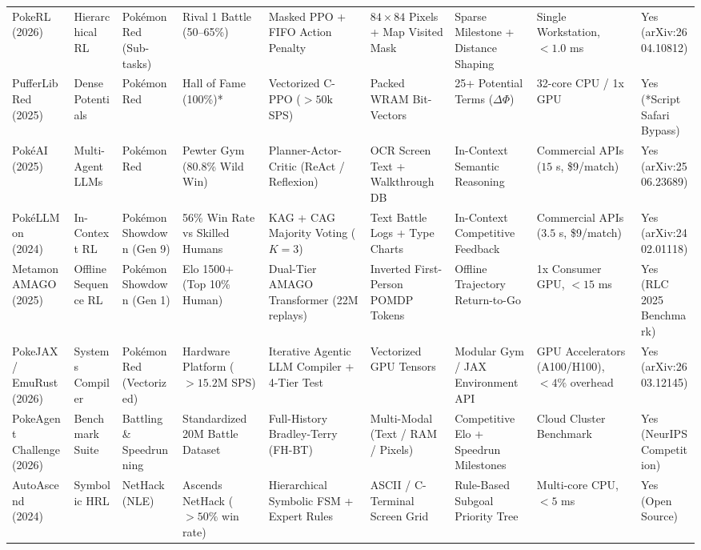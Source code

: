 \documentclass[journal,10pt,twocolumn]{IEEEtran}
\begin{document}
\begin{table}[t]
{\begin{tabular}{@{}lllllllll@{}}
PokeRL (2026)~\cite{mudireddy2026pokerl} & Hierarchical RL & Pok{\'e}mon Red (Sub-tasks) & Rival 1 Battle (50--65\%) & Masked PPO + FIFO Action Penalty & $84 \times 84$ Pixels + Map Visited Mask & Sparse Milestone + Distance Shaping & Single Workstation, $<1.0$ ms & Yes (arXiv:2604.10812) \\
PufferLib Red (2025)~\cite{rubinstein2025puffer,suarez2023pufferlib} & Dense Potentials & Pok{\'e}mon Red & Hall of Fame (100\%)* & Vectorized C-PPO ($>50\text{k}$ SPS) & Packed WRAM Bit-Vectors & 25+ Potential Terms ($\Delta\Phi$) & 32-core CPU / 1x GPU & Yes (*Script Safari Bypass) \\
Pok{\'e}AI (2025)~\cite{liu2025pokeai} & Multi-Agent LLMs & Pok{\'e}mon Red & Pewter Gym (80.8\% Wild Win) & Planner-Actor-Critic (ReAct / Reflexion) & OCR Screen Text + Walkthrough DB & In-Context Semantic Reasoning & Commercial APIs ($15$ s, \$9/match) & Yes (arXiv:2506.23689) \\
Pok{\'e}LLMon (2024)~\cite{hu2024pokellmon} & In-Context RL & Pok{\'e}mon Showdown (Gen 9) & 56\% Win Rate vs Skilled Humans & KAG + CAG Majority Voting ($K=3$) & Text Battle Logs + Type Charts & In-Context Competitive Feedback & Commercial APIs ($3.5$ s, \$9/match) & Yes (arXiv:2402.01118) \\
Metamon AMAGO (2025)~\cite{grigsby2025metamon} & Offline Sequence RL & Pok{\'e}mon Showdown (Gen 1) & Elo 1500+ (Top 10\% Human) & Dual-Tier AMAGO Transformer (22M replays) & Inverted First-Person POMDP Tokens & Offline Trajectory Return-to-Go & 1x Consumer GPU, $<15$ ms & Yes (RLC 2025 Benchmark) \\
PokeJAX / EmuRust (2026)~\cite{karten2026autogen} & Systems Compiler & Pok{\'e}mon Red (Vectorized) & Hardware Platform ($>15.2\text{M}$ SPS) & Iterative Agentic LLM Compiler + 4-Tier Test & Vectorized GPU Tensors & Modular Gym / JAX Environment API & GPU Accelerators (A100/H100), $<4\%$ overhead & Yes (arXiv:2603.12145) \\
PokeAgent Challenge (2026)~\cite{karten2026pokeagent} & Benchmark Suite & Battling \& Speedrunning & Standardized 20M Battle Dataset & Full-History Bradley-Terry (FH-BT) & Multi-Modal (Text / RAM / Pixels) & Competitive Elo + Speedrun Milestones & Cloud Cluster Benchmark & Yes (NeurIPS Competition) \\
AutoAscend (2024)~\cite{pignatelli2024autoascend} & Symbolic HRL & NetHack (NLE) & Ascends NetHack ($>50\%$ win rate) & Hierarchical Symbolic FSM + Expert Rules & ASCII / C-Terminal Screen Grid & Rule-Based Subgoal Priority Tree & Multi-core CPU, $<5$ ms & Yes (Open Source) \\

\end{tabular}}
\end{table}
\end{document}
